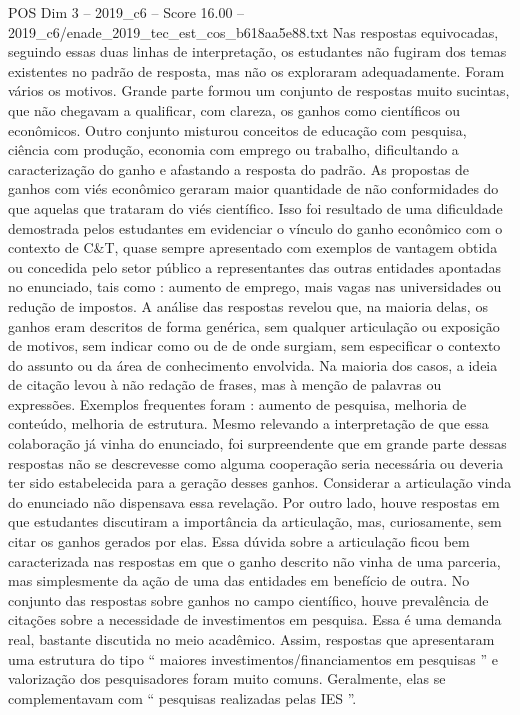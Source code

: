 \begin{textsample}{POS Dim 3 – 2019\_c6 – Score 16.00 – 2019\_c6/enade\_2019\_tec\_est\_cos\_b618aa5e88.txt}
Nas respostas equivocadas, seguindo essas duas linhas de interpretação, os estudantes não fugiram dos temas existentes no padrão de resposta, mas não os exploraram adequadamente.
Foram vários os motivos.
Grande parte formou um conjunto de respostas muito sucintas, que não chegavam a qualificar, com clareza, os ganhos como científicos ou econômicos.
Outro conjunto misturou conceitos de educação com pesquisa, ciência com produção, economia com emprego ou trabalho, dificultando a caracterização do ganho e afastando a resposta do padrão.
As propostas de ganhos com viés econômico geraram maior quantidade de não conformidades do que aquelas que trataram do viés científico.
Isso foi resultado de uma dificuldade demostrada pelos estudantes em evidenciar o vínculo do ganho econômico com o contexto de C\&T, quase sempre apresentado com exemplos de vantagem obtida ou concedida pelo setor público a representantes das outras entidades apontadas no enunciado, tais como : aumento de emprego, mais vagas nas universidades ou redução de impostos.
A análise das respostas revelou que, na maioria delas, os ganhos eram descritos de forma genérica, sem qualquer articulação ou exposição de motivos, sem indicar como ou de de onde surgiam, sem especificar o contexto do assunto ou da área de conhecimento envolvida.
Na maioria dos casos, a ideia de citação levou à não redação de frases, mas à menção de palavras ou expressões.
Exemplos frequentes foram : aumento de pesquisa, melhoria de conteúdo, melhoria de estrutura.
Mesmo relevando a interpretação de que essa colaboração já vinha do enunciado, foi surpreendente que em grande parte dessas respostas não se descrevesse como alguma cooperação seria necessária ou deveria ter sido estabelecida para a geração desses ganhos.
Considerar a articulação vinda do enunciado não dispensava essa revelação.
Por outro lado, houve respostas em que estudantes discutiram a importância da articulação, mas, curiosamente, sem citar os ganhos gerados por elas.
Essa dúvida sobre a articulação ficou bem caracterizada nas respostas em que o ganho descrito não vinha de uma parceria, mas simplesmente da ação de uma das entidades em benefício de outra.
No conjunto das respostas sobre ganhos no campo científico, houve prevalência de citações sobre a necessidade de investimentos em pesquisa.
Essa é uma demanda real, bastante discutida no meio acadêmico.
Assim, respostas que apresentaram uma estrutura do tipo “ maiores investimentos/financiamentos em pesquisas ” e valorização dos pesquisadores foram muito comuns.
Geralmente, elas se complementavam com “ pesquisas realizadas pelas IES ”.

\end{textsample}
